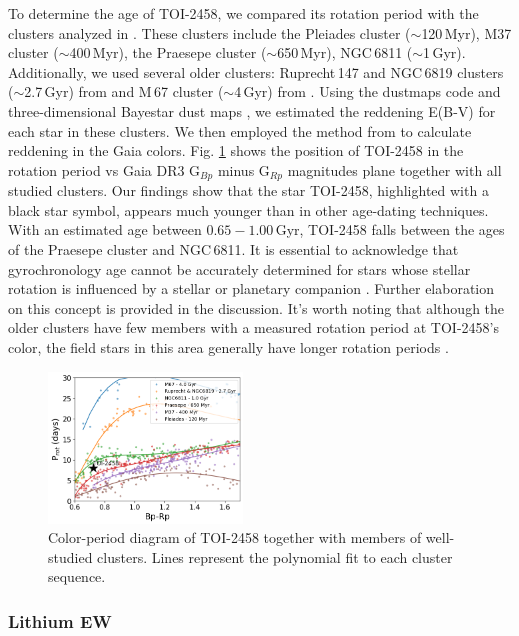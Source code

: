 \documentclass[traditabstract,longauth]{aa}
\begin{document}
To determine the age of TOI-2458, we compared its rotation period with the clusters analyzed in \citet{Godoy21}. These clusters include the Pleiades cluster ($\sim$120\,Myr), M37 cluster ($\sim$400\,Myr), the Praesepe cluster ($\sim$650\,Myr), NGC\,6811 ($\sim$1\,Gyr). Additionally, we used several older clusters: Ruprecht\,147 and NGC\,6819 clusters ($\sim$2.7\,Gyr) from \citet{Curtis20} and M\,67 cluster ($\sim$4\,Gyr) from \citet{Barnes16}. Using the dustmaps code \citep{Green18} and three-dimensional Bayestar dust maps \citep{Green19}, we estimated the reddening E(B-V) for each star in these clusters. We then employed the method from \citet{Gaia2018} to calculate reddening in the Gaia colors. Fig. \ref{fig:gyroch} shows the position of TOI-2458 in the rotation period vs Gaia DR3 G$_{Bp}$ minus G$_{Rp}$ magnitudes plane together with all studied clusters. Our findings show that the star TOI-2458, highlighted with a black star symbol, appears much younger than in other age-dating techniques. With an estimated age between $0.65-1.00$\,Gyr, TOI-2458 falls between the ages of the Praesepe cluster and NGC\,6811. It is essential to acknowledge that gyrochronology age cannot be accurately determined for stars whose stellar rotation is influenced by a stellar or planetary companion \citep{Benbakoura19}. Further elaboration on this concept is provided in the discussion. It's worth noting that although the older clusters have few members with a measured rotation period at TOI-2458's color, the field stars in this area generally have longer rotation periods \citep{Dungee22}.

\begin{figure}
\centering
\includegraphics[width=0.46\textwidth, trim= {0.0cm 0.0cm 0.0cm 0.0cm}]{figures/gyroch_v2.png}
\caption{Color-period diagram of TOI-2458 together with members of well-studied clusters. Lines represent the polynomial fit to each cluster sequence.} \label{fig:gyroch}
\end{figure}

\subsubsection{Lithium EW}
\end{document}
